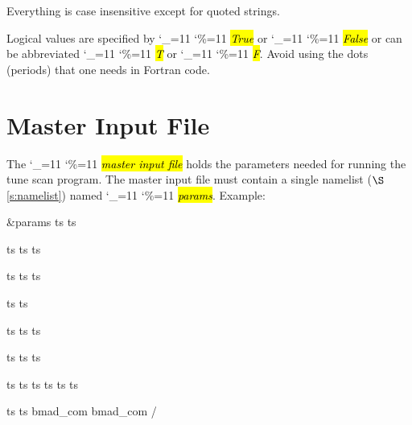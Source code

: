 \documentclass{hitec}
\newcommand\dottcmd[1]{\hl{\em#1}\endgroup}
\newcommand{\vn}{\begingroup\catcode`\_=11 \catcode`\%=11 \dottcmd}
\newcommand{\sref}[1]{$\S$\ref{#1}}
\newcommand{\Section}[1]{\section{#1}\vspace*{-1ex}}
\begin{document}
Everything is case insensitive except for quoted strings.

Logical values are specified by \vn{True} or \vn{False} or can be
abbreviated \vn{T} or \vn{F}. Avoid using the dots (periods) that one
needs in Fortran code.

\newpage

\Section{Master Input File}
\label{s:input}

The \vn{master input file} holds the parameters needed for running the tune scan program. The master
input file must contain a single namelist (\sref{s:namelist}) named \vn{params}.  Example:
\begin{code}
&params
  ts%
  ts%

  ts%
  ts%
  ts%

  ts%
  ts%
  ts%

  ts%
  ts%

  ts%
  ts%
  ts%

  ts%
  ts%
  ts%

  ts%
  ts%
  ts%
  ts%
  ts%
  ts%

  ts%
  ts%
  bmad_com%
  bmad_com%
/
\end{code}
\end{document}
